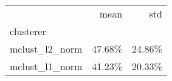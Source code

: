 \begin{tabular}{lrr}
\toprule
{} &   mean &    std \\
clusterer      &        &        \\
\midrule
mclust\_l2\_norm & 47.68\% & 24.86\% \\
mclust\_l1\_norm & 41.23\% & 20.33\% \\
\bottomrule
\end{tabular}

